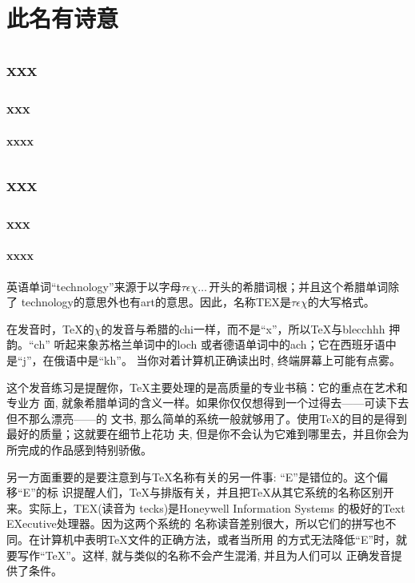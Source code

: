 
\chapter{此名有诗意}
\section{xxx}
\subsection{xxx}
\subsubsection{xxxx}
\section{xxx}
\subsection{xxx}
\subsubsection{xxxx}
英语单词“technology”来源于以字母$\tau\epsilon\chi\ldots\,$开头的希腊词根；并且这个希腊单词除了
technology的意思外也有art的意思。因此，名称TEX是$\tau\epsilon\chi$的大写格式。

在发音时，\TeX 的$\chi$的发音与希腊的chi一样，而不是“x”，所以\TeX 与blecchhh 押韵。“ch”
听起来象苏格兰单词中的loch 或者德语单词中的ach；它在西班牙语中是“j”，在俄语中是“kh”。
当你对着计算机正确读出时, 终端屏幕上可能有点雾。

这个发音练习是提醒你，\TeX 主要处理的是高质量的专业书稿：它的重点在艺术和专业方
面, 就象希腊单词的含义一样。如果你仅仅想得到一个过得去——可读下去但不那么漂亮——的
文书, 那么简单的系统一般就够用了。使用\TeX 的目的是得到最好的质量；这就要在细节上花功
夫, 但是你不会认为它难到哪里去，并且你会为所完成的作品感到特别骄傲。

另一方面重要的是要注意到与\TeX 名称有关的另一件事: “E”是错位的。这个偏移“E”的标
识提醒人们，\TeX 与排版有关，并且把\TeX 从其它系统的名称区别开来。实际上，TEX(读音为
tecks)是Honeywell Information Systems 的极好的Text EXecutive处理器。因为这两个系统的
名称读音差别很大，所以它们的拼写也不同。在计算机中表明\TeX 文件的正确方法，或者当所用
的方式无法降低“E”时，就要写作“TeX”。这样, 就与类似的名称不会产生混淆, 并且为人们可以
正确发音提供了条件。
